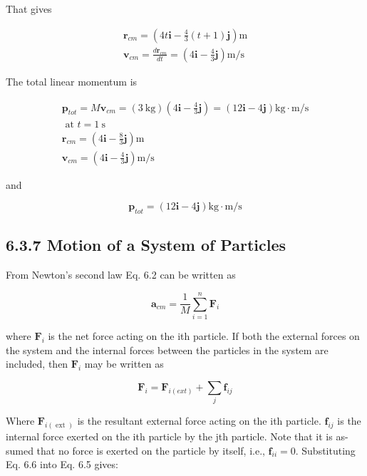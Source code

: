 \documentclass[10pt]{article}
\begin{document}
That gives

$$
\begin{gathered}
\mathbf{r}_{c m}=\left(4 t \mathbf{i}-\frac{4}{3}(t+1) \mathbf{j}\right) \mathrm{m} \\
\mathbf{v}_{c m}=\frac{d \mathbf{r}_{c m}}{d t}=\left(4 \mathbf{i}-\frac{4}{3} \mathbf{j}\right) \mathrm{m} / \mathrm{s}
\end{gathered}
$$

The total linear momentum is

$$
\begin{gathered}
\mathbf{p}_{t o t}=M \mathbf{v}_{c m}=(3 \mathrm{~kg})\left(4 \mathbf{i}-\frac{4}{3} \mathbf{j}\right)=(12 \mathbf{i}-4 \mathbf{j}) \mathrm{kg} \cdot \mathrm{m} / \mathrm{s} \\
\text { at } t=1 \mathrm{~s} \\
\mathbf{r}_{c m}=\left(4 \mathbf{i}-\frac{8}{3} \mathbf{j}\right) \mathrm{m} \\
\mathbf{v}_{c m}=\left(4 \mathbf{i}-\frac{4}{3} \mathbf{j}\right) \mathrm{m} / \mathrm{s}
\end{gathered}
$$

and

$$
\mathbf{p}_{t o t}=(12 \mathbf{i}-4 \mathbf{j}) \mathrm{kg} \cdot \mathrm{m} / \mathrm{s}
$$

\subsection*{6.3.7 Motion of a System of Particles}
From Newton's second law Eq. 6.2 can be written as


\begin{equation*}
\mathbf{a}_{c m}=\frac{1}{M} \sum_{i=1}^{n} \mathbf{F}_{i} \tag{6.5}
\end{equation*}


where $\mathbf{F}_{i}$ is the net force acting on the ith particle. If both the external forces on the system and the internal forces between the particles in the system are included, then $\mathbf{F}_{i}$ may be written as


\begin{equation*}
\mathbf{F}_{i}=\mathbf{F}_{i(e x t)}+\sum_{j} \mathbf{f}_{i j} \tag{6.6}
\end{equation*}


Where $\mathbf{F}_{i(\text { ext })}$ is the resultant external force acting on the ith particle. $\mathbf{f}_{i j}$ is the internal force exerted on the ith particle by the jth particle. Note that it is as- sumed that no force is exerted on the particle by itself, i.e., $\mathbf{f}_{i i}=0$. Substituting Eq. 6.6 into Eq. 6.5 gives:
\end{document}
